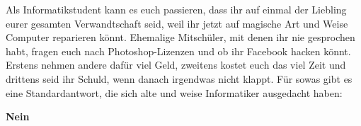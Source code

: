 Als Informatikstudent kann es euch passieren, dass ihr auf einmal der Liebling
eurer gesamten Verwandtschaft seid,
weil ihr jetzt auf magische Art und Weise Computer
reparieren k\"onnt. Ehemalige Mitsch\"uler, mit denen ihr nie gesprochen habt,
fragen euch nach Photoshop-Lizenzen und ob ihr Facebook hacken
k\"onnt. Erstens nehmen andere daf\"ur viel Geld, zweitens kostet euch das viel
Zeit und drittens seid ihr Schuld, wenn danach irgendwas nicht klappt. F\"ur
sowas gibt es eine Standardantwort, die sich alte und weise Informatiker
ausgedacht haben:
\begin{center}{\sffamily\textbf{\Huge Nein}}\end{center}


